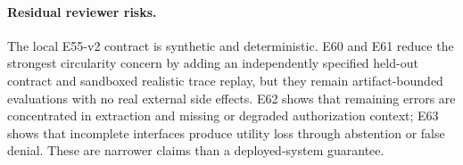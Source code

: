 \paragraph{Residual reviewer risks.}
The local E55-v2 contract is synthetic and deterministic. E60 and E61 reduce the strongest circularity concern by adding an independently specified held-out contract and sandboxed realistic trace replay, but they remain artifact-bounded evaluations with no real external side effects. E62 shows that remaining errors are concentrated in extraction and missing or degraded authorization context; E63 shows that incomplete interfaces produce utility loss through abstention or false denial. These are narrower claims than a deployed-system guarantee.
